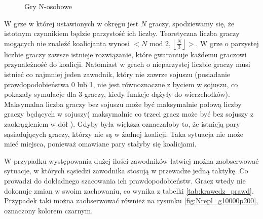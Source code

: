 \begin{figure}
\begin{tabular}{c|c}
	\end{tabular}
\caption{Gry N-osobowe}
\label{fig:replN_10}
\end{figure}
W grze w której ustawionych w okręgu jest $N$ graczy, spodziewamy się, że istotnym czynnikiem będzie parzystość ich liczby. Teoretyczna liczba graczy mogących nie znaleźć koalicjanta wynosi $< N\text{ mod }2, \left\lfloor \frac{N}{3} \right\rfloor >$. W grze o parzystej liczbie graczy zawsze istnieje rozwiązanie, które gwarantuje każdemu graczowi przynależność do koalicji. Natomiast w grach o nieparzystej liczbie graczy musi istnieć co najmniej jeden zawodnik, który nie zawrze sojuszu (posiadanie prawdopodobieństwa 0 lub 1, nie jest równoznaczne z byciem w sojuszu, co pokazały symulacje dla 3-graczy, kiedy funkcje dążyły do wierzchołków). Maksymalna liczba graczy bez sojuszu może być maksymalnie połową liczby graczy będących w sojuszy( maksymalnie co trzeci gracz może być bez sojuszy z zaokrągleniem w dół ). Gdyby była większa oznaczałoby to, że istnieją pary sąsiadujących graczy, którzy nie są w żadnej koalicji. Taka sytuacja nie może mieć miejsca, ponieważ omawiane pary stałyby się koalicjami. 

W przypadku występowania dużej ilości zawodników łatwiej można zaobserwować sytuacje, w których sąsiedzi zawodnika stosują w przewadze jedną taktykę. Co prowadzi do dokładnego szacowania ich prawdopodobieństw. Gracz wtedy nie dokonuje zmian w swoim zachowaniu, co wynika z tabelki \ref{tab:krawedz_prawd}. Przypadek taki można zaobserwować również na rysunku \ref{fig:Nrepl_g10000p200}, oznaczony kolorem czarnym.

































